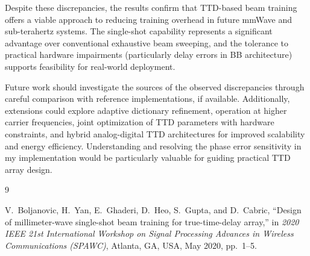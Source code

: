 \documentclass[12pt,letterpaper]{article}
\begin{document}
Despite these discrepancies, the results confirm that TTD-based beam training offers a viable approach to reducing training overhead in future mmWave and sub-terahertz systems. The single-shot capability represents a significant advantage over conventional exhaustive beam sweeping, and the tolerance to practical hardware impairments (particularly delay errors in BB architecture) supports feasibility for real-world deployment.

Future work should investigate the sources of the observed discrepancies through careful comparison with reference implementations, if available. Additionally, extensions could explore adaptive dictionary refinement, operation at higher carrier frequencies, joint optimization of TTD parameters with hardware constraints, and hybrid analog-digital TTD architectures for improved scalability and energy efficiency. Understanding and resolving the phase error sensitivity in my implementation would be particularly valuable for guiding practical TTD array design.

\begin{thebibliography}{9}

V.~Boljanovic, H.~Yan, E.~Ghaderi, D.~Heo, S.~Gupta, and D.~Cabric,
``Design of millimeter-wave single-shot beam training for true-time-delay array,''
in \textit{2020 IEEE 21st International Workshop on Signal Processing Advances in Wireless Communications (SPAWC)},
Atlanta, GA, USA, May 2020, pp.~1--5.

\end{thebibliography}
\end{document}
